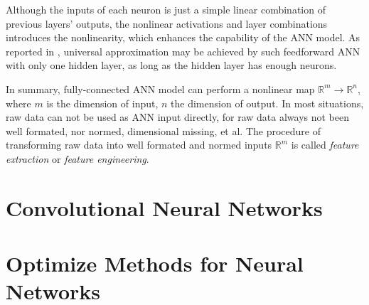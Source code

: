 Although the inputs of each neuron is just a simple linear combination of previous
layers' outputs, the nonlinear activations and layer combinations introduces the
nonlinearity, which enhances the capability of the ANN model. 
As reported in \cite{hornik1989multilayer}, universal approximation may be achieved by
such feedforward ANN with only one hidden layer, as long as the hidden layer has enough neurons.

In summary, fully-connected ANN model can perform a nonlinear map $\mathbb{R}^m \to \mathbb{R}^n$,
where $m$ is the dimension of input, $n$ the dimension of output. In most situations, raw data
can not be used as ANN input directly, for raw data always not been well formated, nor normed, 
dimensional missing, et al.
The procedure of transforming raw data into well formated and normed inputs $\mathbb{R}^m$ is called
\textit{feature extraction} or \textit{feature engineering}.

\section{Convolutional Neural Networks}

\section{Optimize Methods for Neural Networks}
